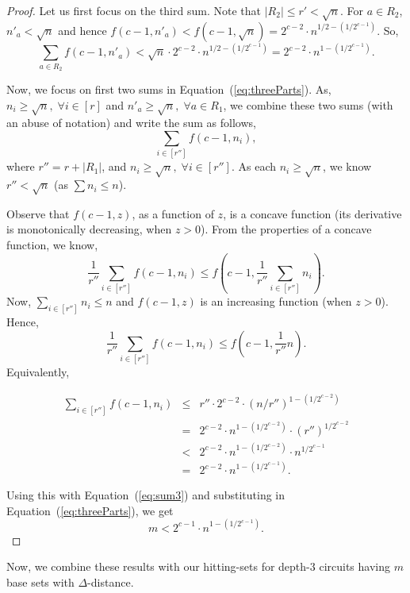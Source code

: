 \documentclass[final,oneeqnum, onethmnum, onefignum]{siamltex1213}
\newcommand{\abs}[1]{\lvert #1 \rvert}
\newcommand{\di}{\Delta} %
\begin{document}
\begin{proof}
Let us first focus on the third sum. 
Note that $\abs{R_2} \leq r' < \sqrt{n}$.
For $a \in R_2$, $n'_a < \sqrt{n}$ and hence 
$f(c-1, n'_a) < f(c-1, \sqrt{n}) = 
2^{c-2} \cdot n^{1/2 - (1/2^{c-1})}$.
So, 
\begin{equation}
\label{eq:sum3}
\sum_{a \in R_2} f(c-1, n'_a) < \sqrt{n} \cdot 2^{c-2} \cdot n^{1/2 - (1/2^{c-1})} 
= 2^{c-2} \cdot n^{1 - (1/2^{c-1})} .
\end{equation}

Now, we focus on first two sums in Equation~(\ref{eq:threeParts}). As, $n_i \geq \sqrt{n}, \; \forall i \in [r]$ and 
$n'_a \geq \sqrt{n}, \; \forall a \in R_1$, we combine these two sums (with an abuse of notation)
and write the sum as follows,
$$ \sum_{i \in [r'']} f(c-1, n_i) ,$$
where $r'' = r + \abs{R_1}$, and $n_i \geq \sqrt{n}, \; \forall i \in [r''] $. 
As each $n_i \geq \sqrt{n}$, we know $r'' < \sqrt{n}$ (as $\sum n_i \leq n$). 

Observe that $f(c-1, z)$, as a function of $z$, is a concave function (its derivative is monotonically decreasing, when $z > 0$). From the properties of a concave function, we know,
$$ \frac{1}{r''}\sum_{i \in [r'']} f(c-1, n_i) \leq 
       f \left( c-1, \frac{1}{r''} \sum_{ i \in [r'']} n_i \right).
$$
Now, $\sum_{i \in [r'']} n_i \leq n$ and $f(c-1, z)$ is an increasing function (when $z >0$). Hence, 
$$ \frac{1}{r''}\sum_{i \in [r'']} f(c-1, n_i) \leq 
       f \left( c-1, \frac{1}{r''} n \right).
$$
Equivalently,

\begin{eqnarray*} 
\sum_{i \in [r'']} f(c-1, n_i) &\leq &
      r''  \cdot 2^{c-2} \cdot (n/r'')^{1 - (1/2^{c-2})} \\
	&=& 2^{c-2} \cdot n^{1- (1/2^{c-2})} \cdot (r'')^{1/2^{c-2}} \\
	& < & 2^{c-2} \cdot n^{1- (1/2^{c-2})} \cdot n^{1/2^{c-1}} \\
	& = & 2^{c-2} \cdot n^{1- (1/2^{c-1})}. 
\end{eqnarray*}

Using this with Equation~(\ref{eq:sum3}) and substituting in Equation~(\ref{eq:threeParts}),
we get
$$ m < 2^{c-1} \cdot n^{1- (1/2^{c-1})} .$$
\end{proof}

Now, we combine these results with our hitting-sets for 
depth-$3$ circuits having $m$ base sets with $\di$-distance. 
\end{document}
